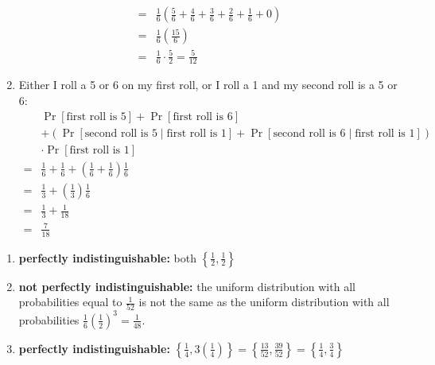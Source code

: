 \begin{answer}
\begin{enumerate}
\begin{align*}
            =& \frac{1}{6} \left(
                \frac{5}{6}+\frac{4}{6}+\frac{3}{6}+\frac{2}{6}+\frac{1}{6}+0
            \right)\\
            =& \frac{1}{6} \left( \frac{15}{6}\right)\\
            =& \frac{1}{6} \cdot \frac{5}{2} = \frac{5}{12}
        \end{align*}
        \item Either I roll a 5 or 6 on my first roll, or I roll a 1 and my second roll is 
        a 5 or 6:
        \begin{align*}
            &\Pr[\text{first roll is }5]
            +\Pr[\text{first roll is }6]\\
            &+\left(\Pr[\text{second roll is }5 \mid \text{first roll is }1]+
            \Pr[\text{second roll is }6 \mid \text{first roll is }1]\right)\\
            &\cdot\Pr[\text{first roll is }1]\\
            =&\frac{1}{6}+\frac{1}{6}+\left(\frac{1}{6}+\frac{1}{6}\right)\frac{1}{6}\\
            =&\frac{1}{3}+\left(\frac{1}{3}\right)\frac{1}{6}\\
            =&\frac{1}{3}+\frac{1}{18}\\
            =&\frac{7}{18}
        \end{align*}
    \end{enumerate}
\end{answer}

\begin{answer}
    \renewcommand{\labelenumi}{(\alph{enumi})}
    \begin{enumerate}
        \item \textbf{perfectly indistinguishable:} 
        both $\left\{\frac{1}{2},\frac{1}{2}\right\}$
        \item \textbf{not perfectly indistinguishable:}
        the uniform distribution with all probabilities equal to 
        $\frac{1}{52}$ is not the same as the uniform distribution 
        with all probabilities $\frac{1}{6}\left(\frac{1}{2}\right)^3 
        = \frac{1}{48}$.
        \item \textbf{perfectly indistinguishable:}
        $\left\{\frac{1}{4},3\left(\frac{1}{4}\right)\right\} 
        = \left\{\frac{13}{52},\frac{39}{52}\right\} 
        = \left\{\frac{1}{4},\frac{3}{4}\right\}$
    \end{enumerate}
\end{answer}
